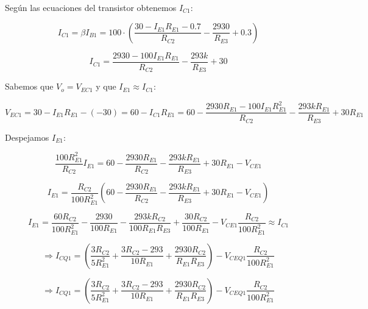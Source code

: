 Según las ecuaciones del transistor obtenemos $I_{C1}$:

\begin{equation*}
  I_{C1} = \beta I_{B1} =
  100 \cdot \left( \frac{30 - I_{E1} R_{E1} - 0.7}{R_{C2}} - \frac{2930}{R_{E3}} + 0.3 \right)
\end{equation*}

\begin{equation*}
  I_{C1} = \frac{2930 - 100 I_{E1} R_{E1}}{R_{C2}} - \frac{293k}{R_{E3}} + 30
\end{equation*}

Sabemos que $V_o = V_{EC1}$ y que $I_{E1} \approx I_{C1}$:

\begin{equation*}
  V_{EC1} =
  30 - I_{E1} R_{E1} - (-30) =
  60 - I_{C1} R_{E1} =
  60 - \frac{2930 R_{E1} - 100 I_{E1} R_{E1}^2}{R_{C2}} - \frac{293k R_{E1}}{R_{E3}} + 30 R_{E1}
\end{equation*}

Despejamos $I_{E1}$:

\begin{equation*}
  \frac{100 R_{E1}^2}{R_{C2}} I_{E1} = 60 - \frac{2930 R_{E1}}{R_{C2}} - \frac{293k R_{E1}}{R_{E3}} + 30 R_{E1} - V_{CE1}
\end{equation*}

\begin{equation*}
  I_{E1} =
  \frac{R_{C2}}{100 R_{E1}^2}
  \left(
    60
    - \frac{2930 R_{E1}}{R_{C2}}
    - \frac{293k R_{E1}}{R_{E3}}
    + 30 R_{E1} - V_{CE1}
  \right)
\end{equation*}

\begin{equation*}
  I_{E1} =
  \frac{60 R_{C2}}{100 R_{E1}^2}
  - \frac{2930}{100 R_{E1}}
  - \frac{293k R_{C2}}{100 R_{E1} R_{E3}}
  + \frac{30 R_{C2}}{100 R_{E1}}
  - V_{CE1} \frac{R_{C2}}{100 R_{E1}^2} \approx I_{C1}
\end{equation*}

\begin{equation*}
  \Rightarrow I_{CQ1} =
  \left(
    \frac{3 R_{C2}}{5 R_{E1}^2}
    + \frac{3 R_{C2} - 293}{10 R_{E1}}
    + \frac{2930 R_{C2}}{R_{E1} R_{E3}}
  \right)
  - V_{CEQ1} \frac{R_{C2}}{100 R_{E1}^2}
\end{equation*}

\begin{equation*}
  \Rightarrow I_{CQ1} =
  \left(
    \frac{3 R_{C2}}{5 R_{E1}^2}
    + \frac{3 R_{C2} - 293}{10 R_{E1}}
    + \frac{2930 R_{C2}}{R_{E1} R_{E3}}
  \right)
  - V_{CEQ1} \frac{R_{C2}}{100 R_{E1}^2}
\end{equation*}

